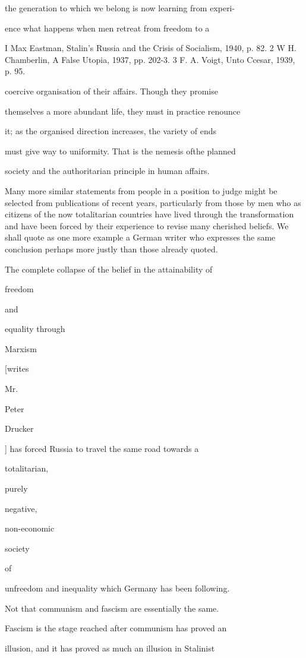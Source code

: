 \documentclass[11pt,openany]{book}
\begin{document}
the generation to which we belong is now learning from experi-

ence what happens when men retreat from freedom to a

I Max Eastman, Stalin's Russia and the Crisis of Socialism, 1940, p. 82. 2 W H. Chamberlin, A False Utopia, 1937, pp. 202-3. 3 F. A. Voigt, Unto Ccesar, 1939, p. 95.

coercive organisation of their affairs. Though they promise

themselves a more abundant life, they must in practice renounce

it; as the organised direction increases, the variety of ends

must give way to uniformity. That is the nemesis ofthe planned

society and the authoritarian principle in human affairs.

Many more similar statements from people in a position to judge might be selected from publications of recent years, particularly from those by men who as citizens of the now totalitarian countries have lived through the transformation and have been forced by their experience to revise many cherished beliefs. We shall quote as one more example a German writer who expresses the same conclusion perhaps more justly than those already quoted.

The complete collapse of the belief in the attainability of

freedom

and

equality through

Marxism

[writes

Mr.

Peter

Drucker

] has forced Russia to travel the same road towards a

totalitarian,

purely

negative,

non-economic

society

of

unfreedom and inequality which Germany has been following.

Not that communism and fascism are essentially the same.

Fascism is the stage reached after communism has proved an

illusion, and it has proved as much an illusion in Stalinist
\end{document}
